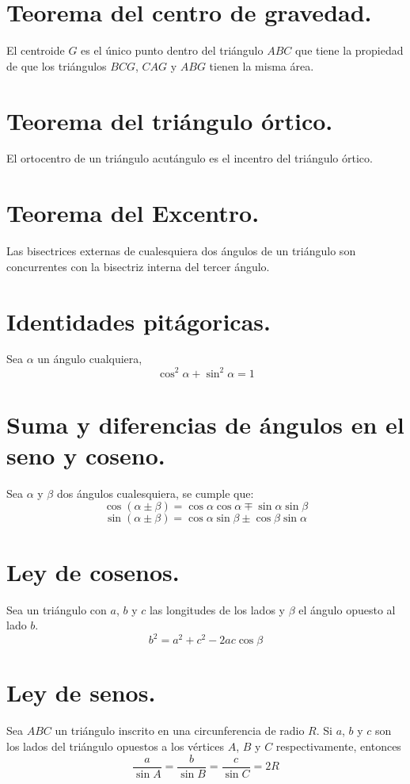\documentclass[12pt,a4paper,oneside]{book}
\begin{document}
\section{Teorema del centro de gravedad.}
El centroide $G$ es el único punto dentro del triángulo $ABC$ que tiene la propiedad de que los triángulos $BCG$, $CAG$ y $ABG$ tienen la misma área.
\section{Teorema del triángulo órtico.}
El ortocentro de un triángulo acutángulo es el incentro del triángulo órtico.
\section{Teorema del Excentro.}
Las bisectrices externas de cualesquiera dos ángulos de un triángulo son concurrentes con la bisectriz interna del tercer ángulo.
\section{Identidades pitágoricas.}
Sea $\alpha$ un ángulo cualquiera,$$\cos^ 2 \alpha + \sin ^2 \alpha =1$$
\section{Suma y diferencias de ángulos en el seno y coseno.}
Sea $\alpha$ y $\beta$ dos ángulos cualesquiera, se cumple que:$$\cos ( \alpha \pm \beta) = \cos \alpha \cos \alpha \mp \sin \alpha \sin \beta$$
$$\sin (\alpha \pm \beta) = \cos \alpha \sin \beta \pm \cos \beta \sin \alpha$$
\section{Ley de cosenos.}
Sea un triángulo con $a$, $b$ y $c$ las longitudes de los lados y $\beta$ el ángulo opuesto al lado $b$.
$$b^2 = a^2 + c^2 -2ac \cos \beta$$
\section{Ley de senos.}
Sea $ABC$ un triángulo inscrito en una circunferencia de radio $R$. Si $a$, $b$ y $c$ son los lados del triángulo opuestos a los vértices $A$, $B$ y $C$ respectivamente, entonces$$ \dfrac{a}{\sin A} = \dfrac{b}{\sin B}= \dfrac{c}{\sin C}= 2R$$
\end{document}
